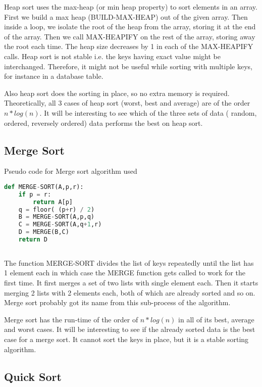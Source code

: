 \documentclass[sigconf, nonacm, natbib, screen, balance=False]{acmart}
\begin{document}
Heap sort uses the max-heap (or min heap property) to sort elements in an array. First we build a max heap (BUILD-MAX-HEAP) out of the given array. Then inside a loop, we isolate the root of the heap from the array, storing it at the end of the array. Then we call MAX-HEAPIFY on the rest of the array, storing away the root each time. The heap size decreases by 1 in each of the MAX-HEAPIFY calls. Heap sort is not stable i.e. the keys having exact value might be interchanged. Therefore, it might not be useful while sorting with multiple keys, for instance in a database table.

Also heap sort does the sorting in place, so no extra memory is required. Theoretically, all 3 cases of heap sort (worst, best and average) are of the order $n*log(n)$. It will be interesting to see which of the three sets of data ( random, ordered, reversely ordered) data performs the best on heap sort. 

\subsection{Merge Sort}\label{sec:merge sort}

\begin{listing}
  \caption{Pseudo code for Merge sort algorithm used}
  \label{lst:merge_algo}
\begin{lstlisting}[language=Python]
def MERGE-SORT(A,p,r):    
    if p = r:
        return A[p]
    q = floor( (p+r) / 2) 
    B = MERGE-SORT(A,p,q)
    C = MERGE-SORT(A,q+1,r)
    D = MERGE(B,C)
    return D
    
\end{lstlisting}
\end{listing}
The function MERGE-SORT divides the list of keys repeatedly until the list has 1 element each in which case the MERGE function gets called to work for the first time. It first merges a set of two lists with single element each. Then it starts merging 2 lists with 2 elements each, both of which are already sorted and so on. Merge sort probably got its name from this sub-process of the algorithm.

Merge sort has the run-time of the order of $n*log(n)$ in all of its best, average and worst cases. It will be interesting to see if the already sorted data is the best case for a merge sort. It cannot sort the keys in place, but it is a stable sorting algorithm.
\subsection{Quick Sort}\label{sec:quick sort}
\end{document}
